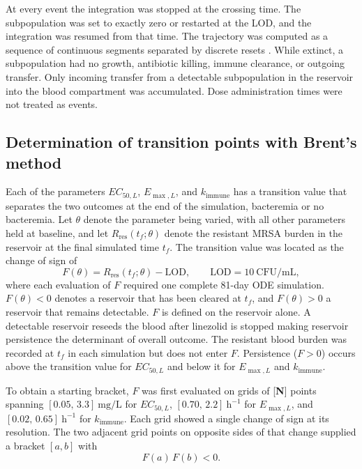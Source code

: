 \documentclass[12pt, draftcls, onecolumn]{IEEEtran}
\begin{document}
At every event the integration was stopped at the crossing time.
The subpopulation
was set to exactly zero or restarted at the LOD, and the integration was
resumed from that time.  The trajectory was computed as a sequence of
continuous segments separated by discrete resets
\cite{Enright1988,ShampineThompson2000}. While extinct, a subpopulation had no growth, antibiotic
killing, immune clearance, or outgoing transfer.  Only incoming transfer from
a detectable subpopulation in the reservoir into the blood compartment was accumulated. Dose administration times were not
treated as events.

\subsection{Determination of transition points with Brent's method}
\label{sec:transition}

Each of the parameters $EC_{50,L}$, $E_{\max,L}$, and $k_{\mathrm{immune}}$ has
a transition value that separates the two outcomes at the end of the
simulation, bacteremia or no bacteremia. Let $\theta$ denote
the parameter being varied, with all other parameters held at baseline, and let
$R_{\mathrm{res}}(t_f;\theta)$ denote the resistant MRSA burden in the
reservoir at the final simulated time $t_f$. The transition value was located
as the change of sign of
\begin{equation}
    F(\theta) = R_{\mathrm{res}}(t_f;\theta) - \mathrm{LOD},
    \qquad \mathrm{LOD} = 10~\mathrm{CFU/mL},
    \label{eq:brent-objective}
\end{equation}
where each evaluation of $F$ required one complete 81-day ODE simulation.
$F(\theta) < 0$ denotes a reservoir that has been cleared at $t_f$, and
$F(\theta) > 0$ a reservoir that remains detectable. $F$ is defined on the
reservoir alone.  A detectable reservoir reseeds the blood after
linezolid is stopped making reservoir persistence the determinant of overall outcome.
The resistant blood burden was recorded at $t_f$ in each simulation but does
not enter $F$. Persistence ($F > 0$) occurs above the transition value for
$EC_{50,L}$ and below it for $E_{\max,L}$ and $k_{\mathrm{immune}}$.

To obtain a starting bracket, $F$ was first evaluated on grids of
[\textbf{N}] points spanning $[0.05,\, 3.3]~\mathrm{mg/L}$ for $EC_{50,L}$,
$[0.70,\, 2.2]~\mathrm{h}^{-1}$ for $E_{\max,L}$, and
$[0.02,\, 0.65]~\mathrm{h}^{-1}$ for $k_{\mathrm{immune}}$. Each grid showed a
single change of sign at its resolution. The two adjacent grid points on
opposite sides of that change supplied a bracket $[a,b]$ with
\begin{equation}
    F(a)\,F(b) < 0.
    \label{eq:brent-bracket}
\end{equation}
\end{document}
